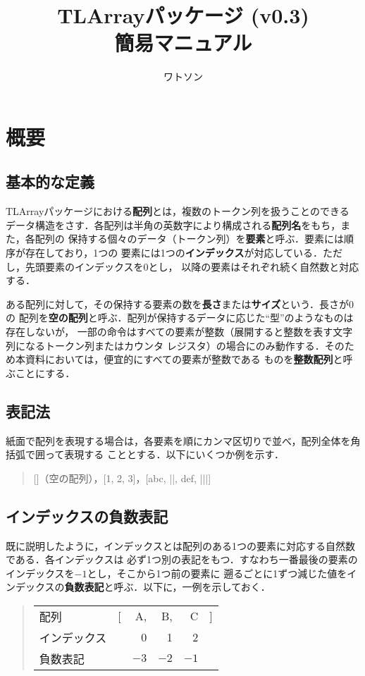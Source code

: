 \documentclass[a4paper,uplatex]{jsarticle}
\title{\textsf{TLArray}パッケージ (v0.3) \\ 簡易マニュアル}
\author{ワトソン}
\begin{document}
\maketitle

\section{概要}

\subsection{基本的な定義}

\textsf{TLArray}パッケージにおける\textbf{配列}とは，複数のトークン列を扱うことのできる
データ構造をさす．各配列は半角の英数字により構成される\textbf{配列名}をもち，また，各配列の
保持する個々のデータ（トークン列）を\textbf{要素}と呼ぶ．要素には順序が存在しており，1つの
要素には1つの\textbf{インデックス}が対応している．ただし，先頭要素のインデックスを0とし，
以降の要素はそれぞれ続く自然数と対応する．

ある配列に対して，その保持する要素の数を\textbf{長さ}または\textbf{サイズ}という．長さが0の
配列を\textbf{空の配列}と呼ぶ．配列が保持するデータに応じた``型''のようなものは存在しないが，
一部の命令はすべての要素が整数（展開すると整数を表す文字列になるトークン列またはカウンタ
レジスタ）の場合にのみ動作する．そのため本資料においては，便宜的にすべての要素が整数である
ものを\textbf{整数配列}と呼ぶことにする．

\subsection{表記法}

紙面で配列を表現する場合は，各要素を順にカンマ区切りで並べ，配列全体を角括弧で囲って表現する
こととする．以下にいくつか例を示す．
%
\begin{quote}
[]（空の配列），[1, 2, 3]，[abc, |\foo|, def, |\bar|]
\end{quote}

\subsection{インデックスの負数表記}

既に説明したように，インデックスとは配列のある1つの要素に対応する自然数である．各インデックスは
必ず1つ別の表記をもつ．すなわち一番最後の要素のインデックスを$-1$とし，そこから1つ前の要素に
遡るごとに1ずつ減じた値をインデックスの\textbf{負数表記}と呼ぶ．以下に，一例を示しておく．
%
\begin{quote}
\begin{tabular}{llrrrl}
配列         & [ & A,   & B,   & C    & ] \\
インデックス &   & 0    & 1    & 2    & \\
負数表記     &   & $-3$ & $-2$ & $-1$ &
\end{tabular}
\end{quote}
\end{document}
